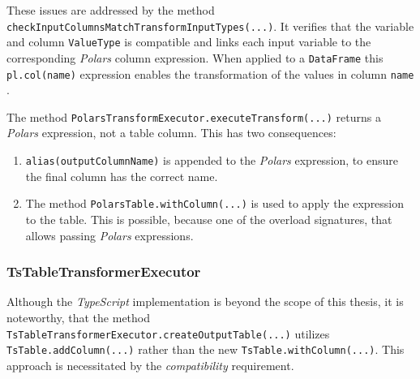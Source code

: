 These issues are addressed by the method \Verb|checkInputColumnsMatchTransformInputTypes(...)|.
It verifies that the variable and column \Verb|ValueType| is compatible and links each input variable to the corresponding \emph{Polars} column expression.
When applied to a \Verb|DataFrame| this \Verb|pl.col(name)| expression enables the transformation of the values in column \Verb|name| \autocite{polars:docs:expr:col}.

The method \Verb|PolarsTransformExecutor.executeTransform(...)| returns a \emph{Polars} expression, not a table column.
This has two consequences:
\begin{enumerate}
	\item \Verb|alias(outputColumnName)| is appended to the \emph{Polars} expression, to ensure the final column has the correct name.
	\item The method \Verb|PolarsTable.withColumn(...)| is used to apply the expression to the table.
	      This is possible, because one of the overload signatures, that allows passing \emph{Polars} expressions.
\end{enumerate}



%
%
%
%
%
%



\subsubsection{TsTableTransformerExecutor}
Although the \emph{TypeScript} implementation is beyond the scope of this thesis, it is noteworthy, that the method \Verb|TsTableTransformerExecutor.createOutputTable(...)| utilizes \Verb|TsTable.addColumn(...)| rather than the new \Verb|TsTable.withColumn(...)|.
This approach is necessitated by the \emph{compatibility} requirement.



